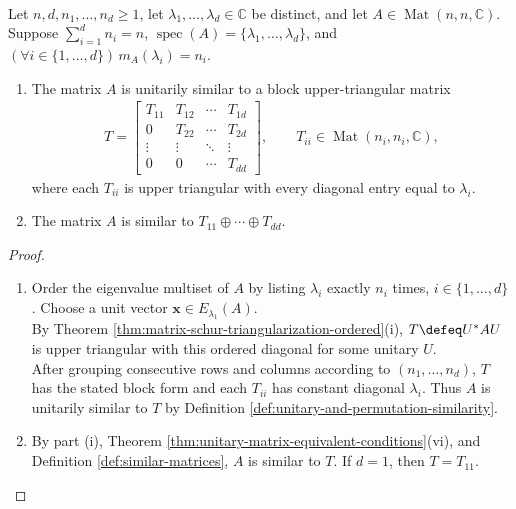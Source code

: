 \begin{theorem} \label{thm:schur-block-form-by-eigenvalue-groups} \\
Let $n,d,n_1,\ldots,n_d\geq1$, let $\lambda_1,\ldots,\lambda_d\in\mathbb{C}$ be distinct, and let $A\in\operatorname{Mat}(n,n,\mathbb{C})$.\\
Suppose $\sum\limits_{i=1}^{d}n_i=n$, $\operatorname{spec}(A)=\{\lambda_1,\ldots,\lambda_d\}$, and $(\forall i\in\{1,\ldots,d\})\,m_A(\lambda_i)=n_i$.
\begin{enumerate}[label=(\roman*)]
\setlength{\itemsep}{0pt}
\item The matrix $A$ is unitarily similar to a block upper-triangular matrix
\begin{align}
T=
\begin{bmatrix}
T_{11}&T_{12}&\cdots&T_{1d}\\
0&T_{22}&\cdots&T_{2d}\\
\vdots&\vdots&\ddots&\vdots\\
0&0&\cdots&T_{dd}
\end{bmatrix},
\qquad
T_{ii}\in\operatorname{Mat}(n_i,n_i,\mathbb{C}),
\nonumber
\end{align}
where each $T_{ii}$ is upper triangular with every diagonal entry equal to $\lambda_i$.
\item The matrix $A$ is similar to $T_{11}\oplus\cdots\oplus T_{dd}$.
\end{enumerate}
\begin{proof}
\begin{enumerate}[label=(\roman*)]
\setlength{\itemsep}{0pt}
\item Order the eigenvalue multiset of $A$ by listing $\lambda_i$ exactly $n_i$ times, $i\in\{1,\ldots,d\}$. Choose a unit vector $\mathbf{x}\in E_{\lambda_1}(A)$.\\
By Theorem \ref{thm:matrix-schur-triangularization-ordered}(i), $T\defeq U^*AU$ is upper triangular with this ordered diagonal for some unitary $U$.\\
After grouping consecutive rows and columns according to $(n_1,\ldots,n_d)$, $T$ has the stated block form and each $T_{ii}$ has constant diagonal $\lambda_i$. Thus $A$ is unitarily similar to $T$ by Definition \ref{def:unitary-and-permutation-similarity}.
\item By part (i), Theorem \ref{thm:unitary-matrix-equivalent-conditions}(vi), and Definition \ref{def:similar-matrices}, $A$ is similar to $T$. If $d=1$, then $T=T_{11}$.\\

\end{enumerate}
\end{proof}
\end{theorem}
